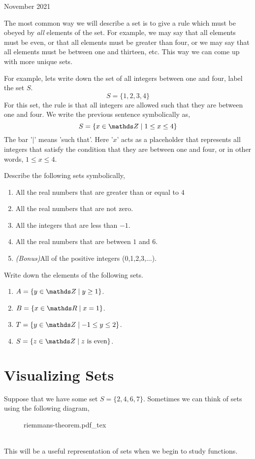 \documentclass[12pt,oneside]{book} %
\newcommand{\incfig}[2][1]{%
    \def\svgwidth{#1\columnwidth}
    {#2.pdf_tex}
}
\begin{document}
\begin{lec}{November 2021}
\begin{notn}
			The most common way we will describe a set is to give a rule which must be obeyed by \emph{all} elements of the set. For
			example, we may say that all elements must be even, or that all elements must be greater than four, or we may say that all
			elements must be between one and thirteen, etc. This way we can come up with more unique sets.

			For example, lets write down the set of all integers between one and four, label the set $S$.
																$$S = \{1,2,3,4\}$$
			For this set, the rule is that all integers are allowed such that they are between one and four. We write the previous
			sentence symbolically as,
										$$S = \{x\in \Z \mid 1 \leq x \leq 4\}$$
			The bar '$\mid$' means 'such that'. Here '$x$' acts as a placeholder that represents all integers that satisfy the condition
			that they are between one and four, or in other words, $1\leq x\leq 4$.
			\end{notn}

		\begin{ex}
			Describe the following sets symbolically,
			\begin{enumerate}
				\item All the real numbers that are greater than or equal to $4$
				\item All the real numbers that are not zero.
				\item All the integers that are less than $-1$.
				\item All the real numbers that are between $1$ and $6$.
				\item \emph{(Bonus)}All of the positive integers (0,1,2,3,$\dots$).
					\end{enumerate}
			\end{ex}

			\begin{ex}
				Write down the elements of the following sets.
				\begin{enumerate}
					\item $A = \{y \in \Z \mid y \geq 1\}$.
					\item $B = \{x \in \R \mid x = 1\}$.
					\item $T = \{y \in \Z \mid -1 \leq y \leq  2\}$.
					\item $S = \{z \in \Z \mid \text{$z$ is even}\}$.
						\end{enumerate}
				\end{ex}
				\newpage
				\section{Visualizing Sets}
				Suppose that we have some set $S = \{2,4,6,7\}$. Sometimes we can think of sets using the following diagram,
				\begin{figure}[ht]
			    \centering
					\incfig[0.3]{riemmans-theorem}
					\label{fig:riemmans-theorem}
				\end{figure}\\
				This will be a useful representation of sets when we begin to study functions.
	\end{lec}
\end{document}
